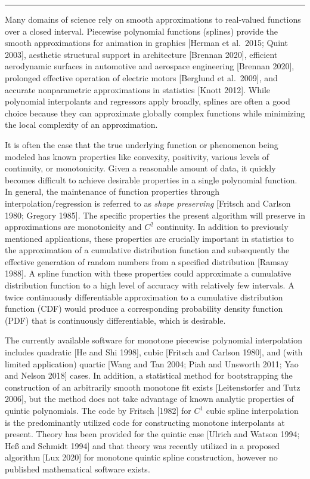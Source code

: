 \bigskip\hrule\bigskip\medskip
{}

Many domains of science rely on smooth approximations to real-valued
functions over a closed interval. Piecewise polynomial functions
(splines) provide the smooth approximations for animation in graphics
[Herman et al.\ 2015; Quint 2003], aesthetic structural support in
architecture [Brennan 2020], efficient aerodynamic surfaces in
automotive and aerospace engineering [Brennan 2020], prolonged
effective operation of electric motors [Berglund et al.\ 2009], and
accurate nonparametric approximations in statistics [Knott
2012]. While polynomial interpolants and regressors apply broadly,
splines are often a good choice because they can approximate globally
complex functions while minimizing the local complexity of an
approximation.

It is often the case that the true underlying function or phenomenon
being modeled has known properties like convexity, positivity,
various levels of continuity, or monotonicity. Given a reasonable
amount of data, it quickly becomes difficult to achieve desirable
properties in a single polynomial function. In general, the
maintenance of function properties through interpolation/regression is
referred to as {\it shape preserving} [Fritsch and Carlson 1980;
Gregory 1985]. The specific properties the present algorithm will
preserve in approximations are monotonicity and $C^2$ continuity. In
addition to previously mentioned applications, these properties are
crucially important in statistics to the approximation of a cumulative
distribution function and subsequently the effective generation of
random numbers from a specified distribution [Ramsay 1988].  A spline
function with these properties could approximate a cumulative
distribution function to a high level of accuracy with relatively few
intervals. A twice continuously differentiable approximation to a
cumulative distribution function (CDF) would produce a corresponding
probability density function (PDF) that is continuously
differentiable, which is desirable.

The currently available software for monotone piecewise polynomial
interpolation includes quadratic [He and Shi 1998], cubic [Fritsch and
Carlson 1980], and (with limited application) quartic [Wang and Tan
2004; Piah and Unsworth 2011; Yao and Nelson 2018] cases. In
addition, a statistical method for bootstrapping the construction of
an arbitrarily smooth monotone fit exists [Leitenstorfer and Tutz
2006], but the method does not take advantage of known analytic
properties of quintic polynomials. The code by Fritsch [1982] for
$C^1$ cubic spline interpolation is the predominantly utilized code
for constructing monotone interpolants at present. Theory has been
provided for the quintic case [Ulrich and Watson 1994; He{\ss} and
Schmidt 1994] and that theory was recently utilized in a proposed
algorithm [Lux 2020] for monotone quintic spline construction, however
no published mathematical software exists.

